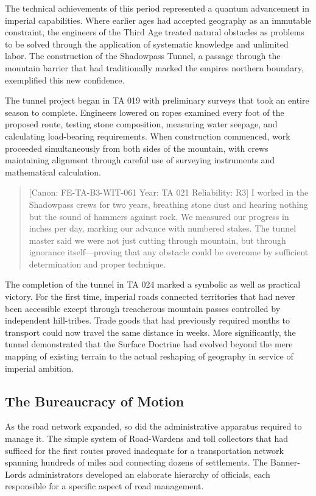 The technical achievements of this period represented a quantum
advancement in imperial capabilities. Where earlier ages had accepted
geography as an immutable constraint, the engineers of the Third Age
treated natural obstacles as problems to be solved through the
application of systematic knowledge and unlimited labor. The
construction of the Shadowpass Tunnel, a passage through the mountain
barrier that had traditionally marked the empire\textquotesingle s
northern boundary, exemplified this new confidence.

The tunnel project began in TA 019 with preliminary surveys that took an
entire season to complete. Engineers lowered on ropes examined every
foot of the proposed route, testing stone composition, measuring water
seepage, and calculating load-bearing requirements. When construction
commenced, work proceeded simultaneously from both sides of the
mountain, with crews maintaining alignment through careful use of
surveying instruments and mathematical calculation.

\begin{quote}
{[}Canon: FE-TA-B3-WIT-061 \textbar{} Year: TA 021 \textbar{}
Reliability: R3{]} I worked in the Shadowpass crews for two years,
breathing stone dust and hearing nothing but the sound of hammers
against rock. We measured our progress in inches per day, marking our
advance with numbered stakes. The tunnel master said we were not just
cutting through mountain, but through ignorance itself---proving that
any obstacle could be overcome by sufficient determination and proper
technique.
\end{quote}

The completion of the tunnel in TA 024 marked a symbolic as well as
practical victory. For the first time, imperial roads connected
territories that had never been accessible except through treacherous
mountain passes controlled by independent hill-tribes. Trade goods that
had previously required months to transport could now travel the same
distance in weeks. More significantly, the tunnel demonstrated that the
Surface Doctrine had evolved beyond the mere mapping of existing terrain
to the actual reshaping of geography in service of imperial ambition.

\subsection{The Bureaucracy of Motion}\label{the-bureaucracy-of-motion}

As the road network expanded, so did the administrative apparatus
required to manage it. The simple system of Road-Wardens and toll
collectors that had sufficed for the first routes proved inadequate for
a transportation network spanning hundreds of miles and connecting
dozens of settlements. The Banner-Lord\textquotesingle s administrators
developed an elaborate hierarchy of officials, each responsible for a
specific aspect of road management.

